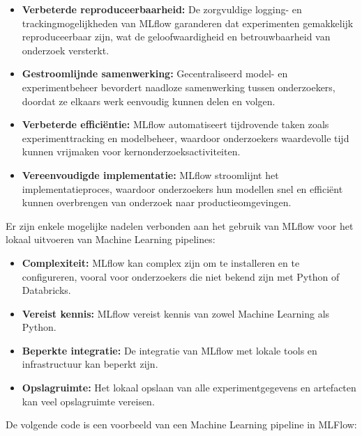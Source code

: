 \begin{itemize}
    \item \textbf{Verbeterde reproduceerbaarheid:} De zorgvuldige logging- en trackingmogelijkheden van MLflow garanderen dat experimenten gemakkelijk reproduceerbaar zijn, wat de geloofwaardigheid en betrouwbaarheid van onderzoek versterkt.
    \item \textbf{Gestroomlijnde samenwerking:} Gecentraliseerd model- en experimentbeheer bevordert naadloze samenwerking tussen onderzoekers, doordat ze elkaars werk eenvoudig kunnen delen en volgen.
    \item \textbf{Verbeterde efficiëntie:} MLflow automatiseert tijdrovende taken zoals experimenttracking en modelbeheer, waardoor onderzoekers waardevolle tijd kunnen vrijmaken voor kernonderzoeksactiviteiten.
    \item \textbf{Vereenvoudigde implementatie:} MLflow stroomlijnt het implementatieproces, waardoor onderzoekers hun modellen snel en efficiënt kunnen overbrengen van onderzoek naar productieomgevingen.
\end{itemize}

Er zijn enkele mogelijke nadelen verbonden aan het gebruik van MLflow voor het lokaal uitvoeren van Machine Learning pipelines:

\begin{itemize}
    \item \textbf{Complexiteit:} MLflow kan complex zijn om te installeren en te configureren, vooral voor onderzoekers die niet bekend zijn met Python of Databricks.
    \item \textbf{Vereist kennis:} MLflow vereist kennis van zowel Machine Learning als Python.
    \item \textbf{Beperkte integratie:} De integratie van MLflow met lokale tools en infrastructuur kan beperkt zijn.
    \item \textbf{Opslagruimte:} Het lokaal opslaan van alle experimentgegevens en artefacten kan veel opslagruimte vereisen.
\end{itemize}

De volgende code is een voorbeeld van een Machine Learning pipeline in MLFlow:


    
